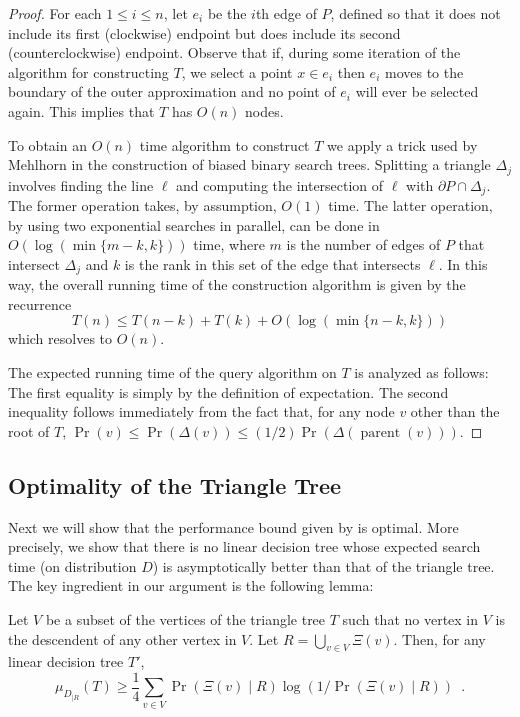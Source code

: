 \documentclass[charterfonts,lotsofwhite]{patmorin}
\newcommand{\boundary}{\partial}
\DeclareMathOperator{\prnt}{parent}
\begin{document}
\begin{proof}
For each $1\le i\le n$, let $e_i$ be the $i$th edge of $P$, defined so
that it does not include its first (clockwise) endpoint but does
include its second (counterclockwise) endpoint.  Observe that if,
during some iteration of the algorithm for constructing $T$, we select
a point $x\in e_i$ then $e_i$ moves to the boundary of the outer
approximation and no point of $e_i$ will ever be selected again.  This
implies that $T$ has $O(n)$ nodes.

To obtain an $O(n)$ time algorithm to construct $T$ we apply a trick
used by Mehlhorn \cite{m75} in the construction of biased binary
search trees.  Splitting a triangle $\Delta_j$ involves finding the
line $\ell$ and computing the intersection of $\ell$ with
$\boundary P\cap \Delta_j$.  The former operation takes, by
assumption, $O(1)$ time.  The latter operation, by using two
exponential searches in parallel, can be done in $O(\log
(\min\{m-k,k\}))$ time, where $m$ is the number of edges of $P$ that
intersect $\Delta_j$ and $k$ is the rank in this set of the edge that
intersects $\ell$.  In this way, the overall running time of the
construction algorithm is given by the recurrence
\[
    T(n) \le T(n-k) + T(k) + O(\log(\min\{n-k,k\}))
\]
which resolves to $O(n)$.

The expected running time of the query algorithm on $T$ is
analyzed as follows: The first equality is simply by the definition of
expectation.  The second inequality follows immediately from the fact
that, for any node $v$ other than the root of $T$, $\Pr(v)\le
\Pr(\Delta(v))\le (1/2)\Pr(\Delta(\prnt(v)))$.
\end{proof}


\subsection{Optimality of the Triangle Tree}

Next we will show that the performance bound given by
 is optimal.  More precisely, we show that there
is no linear decision tree whose expected search time (on distribution
$D$) is asymptotically better than that of the triangle tree.  The key
ingredient in our argument is the following lemma:

\begin{lem}
Let $V$ be a subset of the vertices of the triangle tree $T$ such that
no vertex in $V$ is the descendent of any other vertex in $V$.  
Let $R=\bigcup_{v\in V} \Xi(v)$. Then, for any linear decision
tree $T'$,
\[
    \mu_{D_{|R}}(T) 
	\ge \frac{1}{4}\sum_{v\in V}\Pr(\Xi(v)\mid
R)\log(1/\Pr(\Xi(v)\mid R)) \enspace .
\]
\end{lem}
\end{document}
